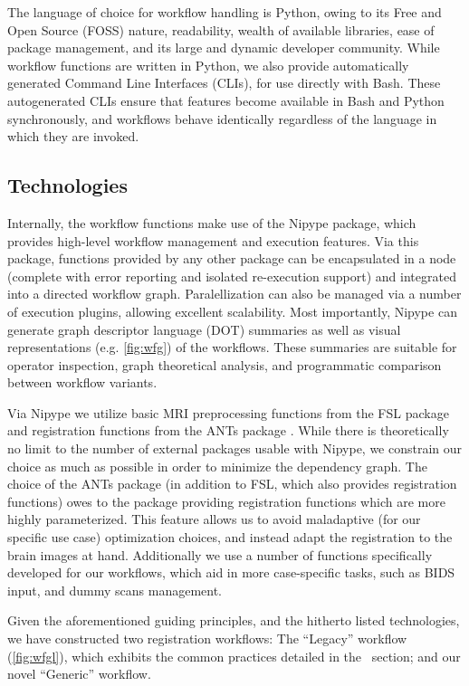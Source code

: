 The language of choice for workflow handling is Python, owing to its Free and Open Source (FOSS) nature, readability, wealth of available libraries, ease of package management, and its large and dynamic developer community.
While workflow functions are written in Python, we also provide automatically generated Command Line Interfaces (CLIs), for use directly with Bash.
These autogenerated CLIs ensure that features become available in Bash and Python synchronously, and workflows behave identically regardless of the language in which they are invoked.

\subsection{Technologies}

Internally, the workflow functions make use of the Nipype \cite{nipype} package, which provides high-level workflow management and execution features.
Via this package, functions provided by any other package can be encapsulated in a node (complete with error reporting and isolated re-execution support) and integrated into a directed workflow graph.
Paralellization can also be managed via a number of execution plugins, allowing excellent scalability.
Most importantly, Nipype can generate graph descriptor language (DOT) summaries as well as visual representations (e.g. \cref{fig:wfg}) of the workflows.
These summaries are suitable for operator inspection, graph theoretical analysis, and programmatic comparison between workflow variants.

Via Nipype we utilize basic MRI preprocessing functions from the FSL package \cite{fsl} and registration functions from the ANTs package \cite{ants}.
While there is theoretically no limit to the number of external packages usable with Nipype, we constrain our choice as much as possible in order to minimize the dependency graph.
The choice of the ANTs package (in addition to FSL, which also provides registration functions) owes to the package providing registration functions which are more highly parameterized.
This feature allows us to avoid maladaptive (for our specific use case) optimization choices, and instead adapt the registration to the brain images at hand.
Additionally we use a number of functions specifically developed for our workflows, which aid in more case-specific tasks, such as BIDS \cite{bids} input, and dummy scans management.

Given the aforementioned guiding principles, and the hitherto listed technologies, we have constructed two registration workflows: The “Legacy” workflow (\cref{fig:wfgl}), which exhibits the common practices detailed in the ~section; and our novel “Generic” workflow.

